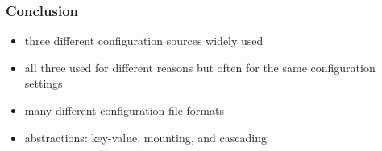 \documentclass{beamer}
\begin{document}
\begin{frame}
	\frametitle{Conclusion}
	\begin{itemize}
	\item three different configuration sources widely used
	\item all three used for different reasons but often for the same configuration settings
	\item many different configuration file formats
	\item abstractions: key-value, mounting, and cascading
	\end{itemize}
\end{frame}



\nocite{raab2017introducing}

\appendix

\begin{frame}[allowframebreaks]
	
	
\end{frame}
\end{document}
